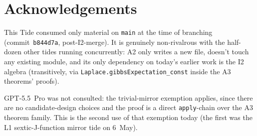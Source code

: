 \documentclass[11pt]{article}
\begin{document}
\section*{Acknowledgements}

This Tide consumed only material on \texttt{main} at the time of
branching (commit~\texttt{b844d7a}, post-I2-merge). It is genuinely
non-rivalrous with the half-dozen other tides running concurrently:
A2 only writes a new file, doesn't touch any existing module, and
its only dependency on today's earlier work is the I2 algebra
(transitively, via \texttt{Laplace.gibbsExpectation\_const} inside
the A3 theorems' proofs).

GPT-5.5~Pro was not consulted: the trivial-mirror exemption applies,
since there are no candidate-design choices and the proof is a
direct \texttt{apply}-chain over the A3 theorem family. This is the
second use of that exemption today (the first was the L1 sextic-J-function
mirror tide on 6~May).
\end{document}
